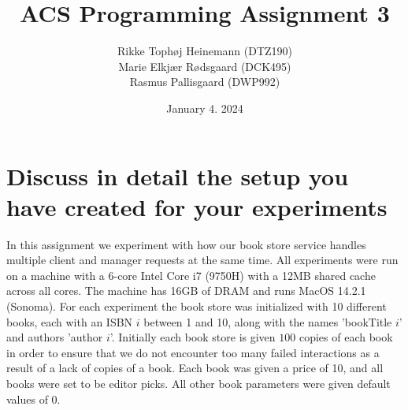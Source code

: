 \documentclass{article}
\title{ACS Programming Assignment 3}
\author{Rikke Tophøj Heinemann (DTZ190) \\ Marie Elkjær Rødsgaard (DCK495) \\ Rasmus Pallisgaard (DWP992)}
\date{January 4. 2024}
\begin{document}
\maketitle

\section{Discuss in detail the setup you have created for your experiments}

In this assignment we experiment with how our book store service handles multiple client and manager requests at the same time. All experiments were run on a machine with a 6-core Intel Core i7 (9750H) with a 12MB shared cache across all cores. The machine has 16GB of DRAM and runs MacOS 14.2.1 (Sonoma). For each experiment the book store was initialized with 10 different books, each with an ISBN $i$ between 1 and 10, along with the names 'bookTitle $i$' and authors 'author $i$'. Initially each book store is given $100$ copies of each book in order to ensure that we do not encounter too many failed interactions as a result of a lack of copies of a book. Each book was given a price of 10, and all books were set to be editor picks. All other book parameters were given default values of 0.
\end{document}
